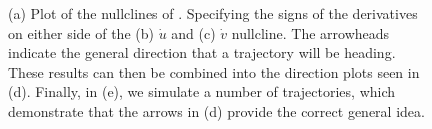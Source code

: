 \begin{figure}[p!!!h!!!tbp]
\caption{\label{Derivative_signs}(a) Plot of the nullclines of . Specifying the signs of the derivatives on either side of the (b) $\dot{u}$ and (c) $\dot{v}$ nullcline. The arrowheads indicate the general direction that a trajectory will be heading. These results can then be combined into the direction plots seen in (d). Finally, in (e), we simulate a number of trajectories, which demonstrate that the arrows in (d) provide the correct general idea.}
\end{figure}


